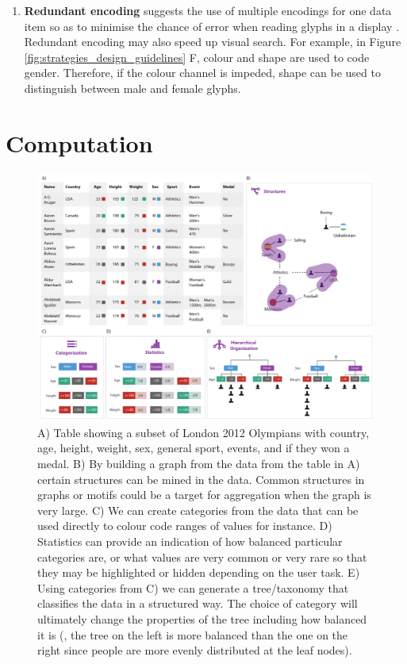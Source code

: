 \begin{enumerate}
\item \textbf{Redundant encoding} suggests the use of multiple encodings for one data item so as to minimise the chance of error when reading glyphs in a display \cite{ware13}.
Redundant encoding may also speed up visual search.
For example, in Figure \ref{fig:strategies_design_guidelines} F, colour and shape are used to code gender.
Therefore, if the colour channel is impeded, shape can be used to distinguish between male and female glyphs.
\end{enumerate}

\section{Computation}

\begin{figure}[h!]
\centering
\includegraphics[width=\textwidth]{images/ch3/computation_benefits}
\caption{A) Table showing a subset of London 2012 Olympians with country, age, height, weight, sex, general sport, events, and if they won a medal.
B) By building a graph from the data from the table in A) certain structures can be mined in the data. Common structures in graphs or motifs could be a target for aggregation when the graph is very large.
C) We can create categories from the data that can be used directly to colour code ranges of values for instance.
D) Statistics can provide an indication of how balanced particular categories are, or what values are very common or very rare so that they may be highlighted or hidden depending on the user task.
E) Using categories from C) we can generate a tree/taxonomy that classifies the data in a structured way.
The choice of category will ultimately change the properties of the tree including how balanced it is (\eg, the tree on the left is more balanced than the one on the right since people are more evenly distributed at the leaf nodes).}
\label{fig:computational_benefits}
\end{figure}


